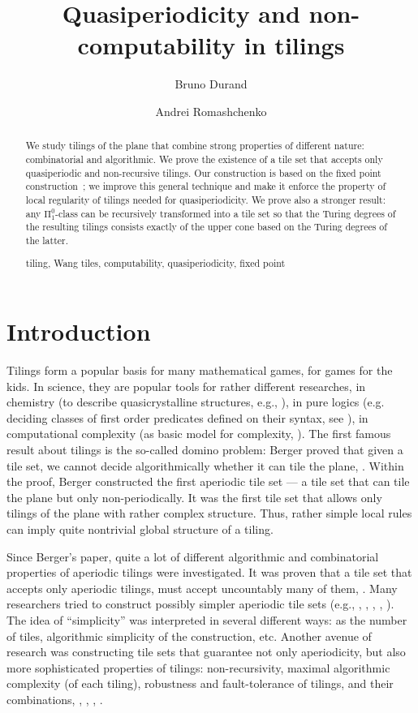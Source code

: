 \documentclass[runningheads]{llncs}
\title{Quasiperiodicity and non-computability in tilings}
\author{Bruno Durand\inst{1}\and Andrei Romashchenko\inst{1,2}}
\institute{LIRMM, Univ. Montpellier \& CNRS
\and
On leave from IITP RAS
}
\newcommand{\keywords}[1]{\par\addvspace\baselineskip
\noindent\keywordname\enspace\ignorespaces#1}
\begin{document}
\maketitle

\begin{abstract}
We study tilings of the plane that combine strong properties of  different nature: combinatorial and algorithmic.  
We  prove the existence of a tile set that accepts only quasiperiodic and non-recursive tilings. Our construction is based on the fixed point construction~\cite{drs}; we improve this general technique  and make it enforce the property of local regularity of tilings  needed for quasiperiodicity. 
We prove also a stronger result:  any  $\mathrm \Pi_1^0$-class can be recursively transformed into a tile set so that the Turing degrees of the resulting tilings consists exactly of the upper cone based on the Turing degrees of the latter. 


 \keywords{tiling, Wang tiles, computability, quasiperiodicity,  fixed point}
\end{abstract}


\section{Introduction}

Tilings form a popular basis for many mathematical games, for games for the kids. In science, they are popular tools for rather different researches, in chemistry (to describe quasicrystalline structures, e.g., \cite{levitov}), in pure logics (e.g. deciding classes of first order predicates defined on their syntax, see \cite{gurevitch}), in computational complexity (as basic model for complexity, \cite{boas}). The first famous result about tilings is the so-called domino problem: Berger proved that given a tile set, we cannot decide algorithmically whether  it can tile the plane,  \cite{berger}. Within the proof, Berger constructed the first aperiodic tile set --- a tile set that can tile the plane but only non-periodically.  It was  the first  tile set that allows only  tilings of the plane with rather complex structure.  Thus, rather simple local rules can imply quite nontrivial global structure of a tiling.

Since Berger's paper, quite a lot of different algorithmic and combinatorial properties of aperiodic tilings were investigated. It was proven that  a tile set that accepts only aperiodic tilings, must accept uncountably many of them, \cite{bruno}. Many researchers  tried to construct  possibly simpler aperiodic tile sets (e.g., \cite{robinson}, \cite{gs}, \cite{kari}, \cite{ollinger}, \cite{drs}). The idea of ``simplicity'' was interpreted in several different ways: as the number of tiles, algorithmic simplicity of the construction, etc. Another avenue of research was constructing tile sets that guarantee not only aperiodicity, but also  more sophisticated  properties  of tilings: non-recursivity, maximal algorithmic complexity (of each tiling), robustness and fault-tolerance of tilings, and their combinations, \cite{nonrecursive1}, \cite{nonrecursive2}, \cite{dls}, \cite{drs}. 
\end{document}
